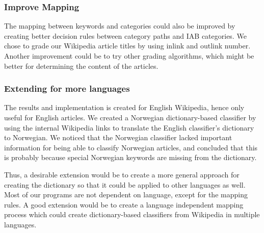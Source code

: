 \subsubsection{Improve Mapping}
The mapping between keywords and categories could also be improved by creating better decision rules between category paths and IAB categories. We chose to grade our Wikipedia article titles by using inlink and outlink number. Another improvement could be to try other grading algorithms, which might be better for determining the content of the articles. 

\subsubsection{Extending for more languages}
The results and implementation is created for English Wikipedia, hence only useful for English articles. We created a Norwegian dictionary-based classifier by using the internal Wikipedia links to translate the English classifier's dictionary to Norwegian. We noticed that the Norwegian classifier lacked important information for being able to classify Norwegian articles, and concluded that this is probably because special Norwegian keywords are missing from the dictionary. 

Thus, a desirable extension would be to create a more general approach for creating the dictionary so that it could be applied to other languages as well. Most of our programs are not dependent on language, except for the mapping rules. A good extension would be to create a language independent mapping process which could create dictionary-based classifiers from Wikipedia in multiple languages. 



